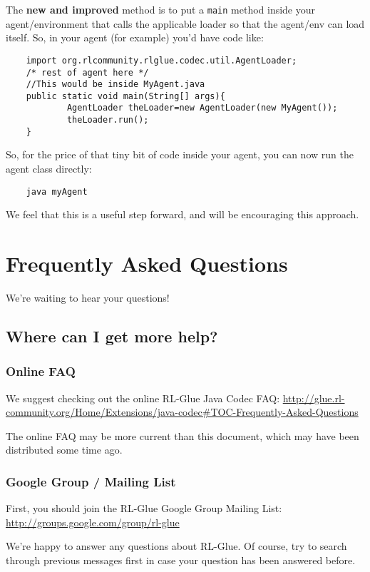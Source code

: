 \documentclass[11pt]{article}
\begin{document}
The \textbf{new and improved} method is to put a \texttt{main} method inside your agent/environment that calls the applicable loader so that the agent/env can load itself.  So, in your agent (for example) you'd have code like:
\begin{verbatim}
	import org.rlcommunity.rlglue.codec.util.AgentLoader;
	/* rest of agent here */
	//This would be inside MyAgent.java
	public static void main(String[] args){
	        AgentLoader theLoader=new AgentLoader(new MyAgent());
	        theLoader.run();
	}
\end{verbatim}

So, for the price of that tiny bit of code inside your agent, you can now run the agent class directly:
\begin{verbatim}
	java myAgent
\end{verbatim}

We feel that this is a useful step forward, and will be encouraging this approach.

\section{Frequently Asked Questions}
We're waiting to hear your questions!

\subsection{Where can I get more help?}
\subsubsection{Online FAQ}
We suggest checking out the online RL-Glue Java Codec FAQ:\newline
\url{http://glue.rl-community.org/Home/Extensions/java-codec#TOC-Frequently-Asked-Questions}

The online FAQ may be more current than this document, which may have been distributed some time ago.

\subsubsection{Google Group / Mailing List}
First, you should join the RL-Glue Google Group Mailing List:\newline
\url{http://groups.google.com/group/rl-glue}

We're happy to answer any questions about RL-Glue.  Of course, try to search through previous messages first in case your question has been answered before.
\end{document}
